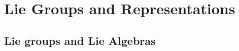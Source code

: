 \documentclass[a4paper,12pt]{article}
\newcommand{\sectionbreak}{\clearpage}
\begin{document}

	\sectionbreak
	\section{Lie Groups and Representations}

	\subsection{Lie groups and Lie Algebras}
\end{document}

